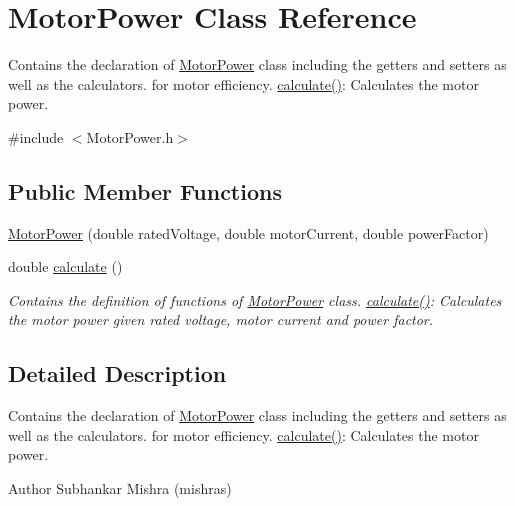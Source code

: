 \hypertarget{class_motor_power}{}\section{Motor\+Power Class Reference}
\label{class_motor_power}


Contains the declaration of \hyperlink{class_motor_power}{Motor\+Power} class including the getters and setters as well as the calculators. for motor efficiency. \hyperlink{class_motor_power_a0beab572e5c46a01e474d6403ec81cf4}{calculate()}\+: Calculates the motor power.  




{\ttfamily \#include $<$Motor\+Power.\+h$>$}

\subsection*{Public Member Functions}
\begin{DoxyCompactItemize}
\item 
\hyperlink{class_motor_power_a16051e65482875fd0f70956ad8d406eb}{Motor\+Power} (double rated\+Voltage, double motor\+Current, double power\+Factor)
\item 
double \hyperlink{class_motor_power_a0beab572e5c46a01e474d6403ec81cf4}{calculate} ()
\begin{DoxyCompactList}\small\item\em Contains the definition of functions of \hyperlink{class_motor_power}{Motor\+Power} class. \hyperlink{class_motor_power_a0beab572e5c46a01e474d6403ec81cf4}{calculate()}\+: Calculates the motor power given rated voltage, motor current and power factor. \end{DoxyCompactList}\end{DoxyCompactItemize}


\subsection{Detailed Description}
Contains the declaration of \hyperlink{class_motor_power}{Motor\+Power} class including the getters and setters as well as the calculators. for motor efficiency. \hyperlink{class_motor_power_a0beab572e5c46a01e474d6403ec81cf4}{calculate()}\+: Calculates the motor power. 

\begin{DoxyAuthor}{Author}
Subhankar Mishra (mishras) 
\end{DoxyAuthor}


